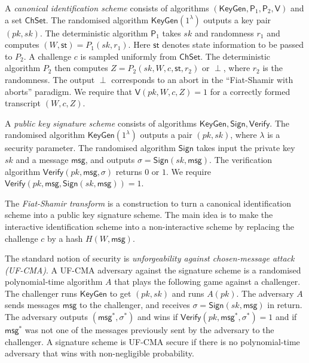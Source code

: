 \documentclass{llncs}
\newcommand{\msg}{\mathsf{msg}}
\newcommand{\KeyGen}{\mathsf{KeyGen}}
\newcommand{\Sign}{\mathsf{Sign}}
\newcommand{\Verify}{\mathsf{Verify}}
\newcommand{\PP}{\mathsf{P}}
\newcommand{\VV}{\mathsf{V}}
\newcommand{\ChSet}{\textsf{ChSet}}
\newcommand{\St}{\textsf{st}}
\begin{document}
A \emph{canonical identification scheme} consists of algorithms $(\KeyGen, \PP_1, \PP_2, \VV)$ and a set $\ChSet$. The randomised algorithm $\KeyGen( 1^\lambda )$ outputs a key pair $(pk,sk)$.
The deterministic algorithm $\PP_1$ takes $sk$ and randomness $r_1$ and computes $(W, \St) = P_1( sk, r_1 )$. 
Here $\St$ denotes state information to be passed to $P_2$.
A challenge $c$ is sampled uniformly from $\ChSet$. The deterministic algorithm $P_2$ then computes $Z = P_2( sk, W, c, \St, r_2 )$ or $\perp$, where $r_2$ is the randomness.
The output $\perp$ corresponds to an abort in the ``Fiat-Shamir with aborts'' paradigm.
We require that $\VV( pk, W, c, Z ) = 1$ for a correctly formed transcript $(W,c,Z)$.


A \emph{public key signature scheme} consists of algorithms $\KeyGen, \Sign, \Verify$.
The randomised algorithm $\KeyGen( 1^\lambda )$ outputs a pair $(pk,sk)$, where $\lambda$ is a security parameter.
The randomised algorithm $\Sign$ takes input the private key $sk$ and a message $\msg$, and  outputs $\sigma = \Sign( sk, \msg )$.
The verification algorithm $\Verify( pk, \msg, \sigma )$ returns $0$ or $1$.
We require $\Verify( pk, \msg, \Sign( sk, \msg )) = 1$.

The \emph{Fiat-Shamir transform} is a construction to turn a canonical identification scheme into a public key signature scheme. The main idea is to make the interactive identification scheme into a non-interactive scheme by replacing the challenge $c$ by a hash $H( W, \msg )$.

The standard notion of security is \emph{unforgeability against chosen-message attack (UF-CMA)}.
A UF-CMA adversary against the signature scheme is a randomised poly\-nomial-time algorithm $A$ that plays the following game against a challenger.
The challenger runs $\KeyGen$ to get $(pk,sk)$ and runs $A( pk )$.
The adversary $A$ sends messages $\msg$ to the challenger, and receives $\sigma = \Sign(sk, \msg)$ in return.
The adversary outputs $(\msg^*, \sigma^*)$ and wins if $\Verify( pk, \msg^*, \sigma^* ) = 1$ and if $\msg^*$ was not one of the messages previously sent by the adversary to the challenger.
A signature scheme is UF-CMA secure if there is no polynomial-time adversary that wins with non-negligible probability.



\end{document}
